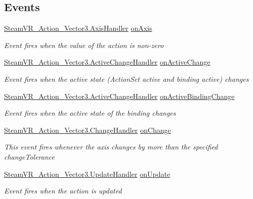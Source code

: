 \subsection*{Events}
\begin{DoxyCompactItemize}
\item 
\mbox{\hyperlink{class_valve_1_1_v_r_1_1_steam_v_r___action___vector3_a9b135b663b22c421dc36dbc48d2d35b6}{Steam\+V\+R\+\_\+\+Action\+\_\+\+Vector3.\+Axis\+Handler}} \mbox{\hyperlink{class_valve_1_1_v_r_1_1_steam_v_r___action___vector3___source_aad31d43b8199ea783c0e93b1feb4038d}{on\+Axis}}
\begin{DoxyCompactList}\small\item\em Event fires when the value of the action is non-\/zero \end{DoxyCompactList}\item 
\mbox{\hyperlink{class_valve_1_1_v_r_1_1_steam_v_r___action___vector3_a47d6c1c558fb45841cd626df9ab3dcb9}{Steam\+V\+R\+\_\+\+Action\+\_\+\+Vector3.\+Active\+Change\+Handler}} \mbox{\hyperlink{class_valve_1_1_v_r_1_1_steam_v_r___action___vector3___source_a72199c73773cc8a7f5a445ede6c4707e}{on\+Active\+Change}}
\begin{DoxyCompactList}\small\item\em Event fires when the active state (Action\+Set active and binding active) changes \end{DoxyCompactList}\item 
\mbox{\hyperlink{class_valve_1_1_v_r_1_1_steam_v_r___action___vector3_a47d6c1c558fb45841cd626df9ab3dcb9}{Steam\+V\+R\+\_\+\+Action\+\_\+\+Vector3.\+Active\+Change\+Handler}} \mbox{\hyperlink{class_valve_1_1_v_r_1_1_steam_v_r___action___vector3___source_a38a15be5432581eb4f7715b3eef97736}{on\+Active\+Binding\+Change}}
\begin{DoxyCompactList}\small\item\em Event fires when the active state of the binding changes \end{DoxyCompactList}\item 
\mbox{\hyperlink{class_valve_1_1_v_r_1_1_steam_v_r___action___vector3_a78943f89733a1c1a8e12cb4896e65907}{Steam\+V\+R\+\_\+\+Action\+\_\+\+Vector3.\+Change\+Handler}} \mbox{\hyperlink{class_valve_1_1_v_r_1_1_steam_v_r___action___vector3___source_a12522241a76d7e22632bea426fc9da08}{on\+Change}}
\begin{DoxyCompactList}\small\item\em This event fires whenever the axis changes by more than the specified change\+Tolerance \end{DoxyCompactList}\item 
\mbox{\hyperlink{class_valve_1_1_v_r_1_1_steam_v_r___action___vector3_a99c0524f104c6d8c94a0e874b0ecc813}{Steam\+V\+R\+\_\+\+Action\+\_\+\+Vector3.\+Update\+Handler}} \mbox{\hyperlink{class_valve_1_1_v_r_1_1_steam_v_r___action___vector3___source_adbe28a16590bb19cb1e996dc8755dc95}{on\+Update}}
\begin{DoxyCompactList}\small\item\em Event fires when the action is updated \end{DoxyCompactList}\end{DoxyCompactItemize}
